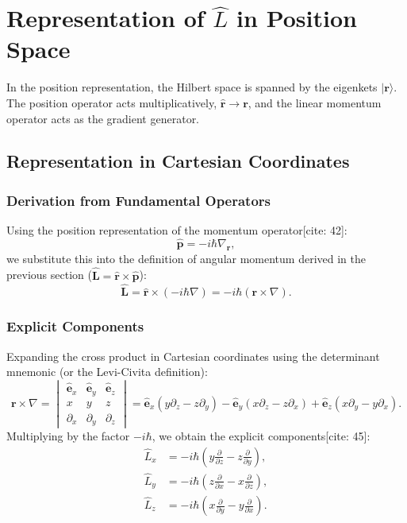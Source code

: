 \section{Representation of $\hat{L}$ in Position Space}

In the position representation, the Hilbert space is spanned by the eigenkets $|\mathbf{r}\rangle$. The position operator acts multiplicatively, $\hat{\mathbf{r}} \to \mathbf{r}$, and the linear momentum operator acts as the gradient generator.

\subsection{Representation in Cartesian Coordinates}

\subsubsection{Derivation from Fundamental Operators}
Using the position representation of the momentum operator[cite: 42]:
\begin{equation}
    \hat{\mathbf{p}} = -i\hbar \nabla_\mathbf{r},
\end{equation}
we substitute this into the definition of angular momentum derived in the previous section ($\hat{\mathbf{L}} = \hat{\mathbf{r}} \times \hat{\mathbf{p}}$):
\begin{equation}
    \hat{\mathbf{L}} = \hat{\mathbf{r}} \times (-i\hbar \nabla) = -i\hbar (\mathbf{r} \times \nabla).
\end{equation}

\subsubsection{Explicit Components}
Expanding the cross product in Cartesian coordinates using the determinant mnemonic (or the Levi-Civita definition):
\begin{equation}
    \mathbf{r} \times \nabla = 
    \begin{vmatrix} 
    \hat{\mathbf{e}}_x & \hat{\mathbf{e}}_y & \hat{\mathbf{e}}_z \\ 
    x & y & z \\ 
    \partial_x & \partial_y & \partial_z 
    \end{vmatrix} 
    = \hat{\mathbf{e}}_x (y\partial_z - z\partial_y) - \hat{\mathbf{e}}_y (x\partial_z - z\partial_x) + \hat{\mathbf{e}}_z (x\partial_y - y\partial_x).
\end{equation}
Multiplying by the factor $-i\hbar$, we obtain the explicit components[cite: 45]:
\begin{align}
    \hat{L}_x &= -i\hbar \left( y \frac{\partial}{\partial z} - z \frac{\partial}{\partial y} \right), \\
    \hat{L}_y &= -i\hbar \left( z \frac{\partial}{\partial x} - x \frac{\partial}{\partial z} \right), \\
    \hat{L}_z &= -i\hbar \left( x \frac{\partial}{\partial y} - y \frac{\partial}{\partial x} \right). \label{eq:Lz_cartesian}
\end{align}

